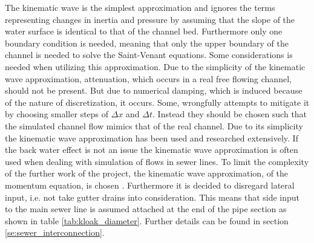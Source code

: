 The kinematic wave is the simplest approximation and ignores the terms representing changes in inertia and pressure by assuming that the slope of the water surface is identical to that of the channel bed. Furthermore only one boundary condition is needed, meaning that only the upper boundary of the channel is needed to solve the Saint-Venant equations.  
Some considerations is needed when utilizing this approximation.      
Due to the simplicity of the kinematic wave approximation, attenuation, which occurs in a real free flowing channel, should not be present. But due to numerical damping, which is induced because of the nature of discretization, it occurs. Some, wrongfully attempts to mitigate it by choosing smaller steps of $\Delta x$ and $\Delta t$. Instead they should be chosen such that the simulated channel flow mimics that of the real channel.
Due to its simplicity the kinematic wave approximation has been used and researched extensively. If the back water effect is not an issue the kinematic wave approximation is often used when dealing with simulation of flows in sewer lines.
To limit the complexity of the further work of the project, the kinematic wave approximation, of the momentum equation, is chosen \cite{stormwatercollectionsystems}.
Furthermore it is decided to disregard lateral input, i.e. not take gutter drains into consideration. 
This means that side input to the main sewer line is assumed attached at the end of the pipe section as shown in table \ref{tab:kloak_diameter}. Further details can be found in section \ref{se:sewer_interconnection}. 






